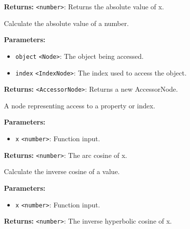 \documentclass[12pt,a4paper]{article}
\begin{document}
\noindent \textbf{Returns:} \texttt{<number>}: Returns the absolute value of \textasciigrave{}x\textasciigrave{}.

\noindent Calculate the absolute value of a number.

\vspace{5mm}
\noindent {}


\noindent \textbf{Parameters:}
\begin{itemize}
  \item \texttt{object} \texttt{<Node>}: The object being accessed.
  \item \texttt{index} \texttt{<IndexNode>}: The index used to access the object.
\end{itemize}

\noindent \textbf{Returns:} \texttt{<AccessorNode>}: Returns a new AccessorNode.

\noindent A node representing access to a property or index.

\vspace{5mm}
\noindent {}


\noindent \textbf{Parameters:}
\begin{itemize}
  \item \texttt{x} \texttt{<number>}: Function input.
\end{itemize}

\noindent \textbf{Returns:} \texttt{<number>}: The arc cosine of \textasciigrave{}x\textasciigrave{}.

\noindent Calculate the inverse cosine of a value.

\vspace{5mm}
\noindent {}


\noindent \textbf{Parameters:}
\begin{itemize}
  \item \texttt{x} \texttt{<number>}: Function input.
\end{itemize}

\noindent \textbf{Returns:} \texttt{<number>}: The inverse hyperbolic cosine of \textasciigrave{}x\textasciigrave{}.
\end{document}
